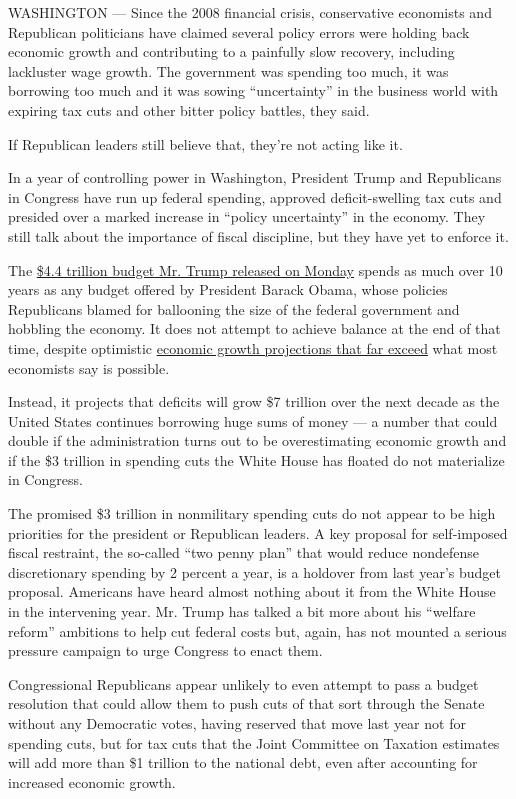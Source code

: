 WASHINGTON --- Since the 2008 financial crisis, conservative economists
and Republican politicians have claimed several policy errors were
holding back economic growth and contributing to a painfully slow
recovery, including lackluster wage growth. The government was spending
too much, it was borrowing too much and it was sowing ``uncertainty'' in
the business world with expiring tax cuts and other bitter policy
battles, they said.

If Republican leaders still believe that, they're not acting like it.

In a year of controlling power in Washington, President Trump and
Republicans in Congress have run up federal spending, approved
deficit-swelling tax cuts and presided over a marked increase in
``policy uncertainty'' in the economy. They still talk about the
importance of fiscal discipline, but they have yet to enforce it.

The
\href{https://www.whitehouse.gov/wp-content/uploads/2018/02/budget-fy2019.pdf}{\$4.4
trillion budget Mr. Trump released on Monday} spends as much over 10
years as any budget offered by President Barack Obama, whose policies
Republicans blamed for ballooning the size of the federal government and
hobbling the economy. It does not attempt to achieve balance at the end
of that time, despite optimistic
\href{https://www.whitehouse.gov/wp-content/uploads/2018/02/spec-fy2019.pdf}{economic
growth projections that far exceed} what most economists say is
possible.

Instead, it projects that deficits will grow \$7 trillion over the next
decade as the United States continues borrowing huge sums of money --- a
number that could double if the administration turns out to be
overestimating economic growth and if the \$3 trillion in spending cuts
the White House has floated do not materialize in Congress.

The promised \$3 trillion in nonmilitary spending cuts do not appear to
be high priorities for the president or Republican leaders. A key
proposal for self-imposed fiscal restraint, the so-called ``two penny
plan'' that would reduce nondefense discretionary spending by 2 percent
a year, is a holdover from last year's budget proposal. Americans have
heard almost nothing about it from the White House in the intervening
year. Mr. Trump has talked a bit more about his ``welfare reform''
ambitions to help cut federal costs but, again, has not mounted a
serious pressure campaign to urge Congress to enact them.

Congressional Republicans appear unlikely to even attempt to pass a
budget resolution that could allow them to push cuts of that sort
through the Senate without any Democratic votes, having reserved that
move last year not for spending cuts, but for tax cuts that the Joint
Committee on Taxation estimates will add more than \$1 trillion to the
national debt, even after accounting for increased economic growth.

